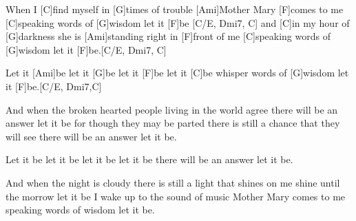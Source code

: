 When I [C]find myself in [G]times of trouble
[Ami]Mother Mary [F]comes to me
[C]speaking words of [G]wisdom let it [F]be [C/E, Dmi7, C]
and [C]in my hour of [G]darkness
she is [Ami]standing right in [F]front of me
[C]speaking words of [G]wisdom let it [F]be.[C/E, Dmi7, C]

Let it [Ami]be let it [G]be let it [F]be let it [C]be
whisper words of [G]wisdom let it [F]be.[C/E, Dmi7,C]

And when the broken hearted people
living in the world agree
there will be an answer let it be
for though they may be parted
there is still a chance that they will see
there will be an answer let it be.

Let it be let it be let it be let it be
there will be an answer let it be.

And when the night is cloudy
there is still a light that shines on me
shine until the morrow let it be
I wake up to the sound of music
Mother Mary comes to me
speaking words of wisdom let it be.




